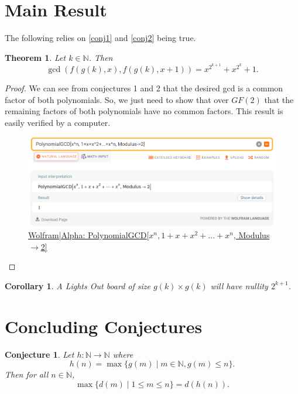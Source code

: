 \documentclass{article}
\newtheorem{theorem}{Theorem}
\newtheorem{corollary}{Corollary}
\newtheorem{conjecture}{Conjecture}
\newcommand{\N}{\mathbb{N}}
\begin{document}
	\section{Main Result}
	The following relies on \ref{conj1} and \ref{conj2} being true.
	\begin{theorem}
		Let $k \in \N$.
		Then
		\begin{equation*}
			\gcd\left(f(g(k),x),f(g(k),x+1)\right) = x^{2^{k+1}} + x^{2^k} + 1.
		\end{equation*}
	\end{theorem}
	\begin{proof}
		We can see from conjectures 1 and 2 that the desired gcd is a common factor of both polynomials.
		So, we just need to show that over $GF(2)$ that the remaining factors of both polynomials have no common factors.
		This result is easily verified by a computer.
		
		\begin{figure}[H]
			\centering
			\includegraphics[width=.8\textwidth]{wolfram_result.png}
			\caption{\href{https://www.wolframalpha.com/input/?i=PolynomialGCD\%5Bx\%5En\%2C+1\%2Bx\%2Bx\%5E2\%2B...\%2Bx\%5En\%2C+Modulus-\%3E2\%5D}{Wolfram|Alpha: PolynomialGCD[$x^n, 1+x+x^2+...+x^n$, Modulus$\to$2]}}
		\end{figure}
	\end{proof}

	\begin{corollary}
		A \textit{Lights Out} board of size $g(k) \times g(k)$ will have nullity $2^{k+1}$.
	\end{corollary}
	
	\section{Concluding Conjectures}
	\begin{conjecture}
		\label{conj3}
		Let $h: \N \to \N$ where
		\begin{equation*}
			h(n) = \max \{g(m) \mid m \in \N, g(m) \leq n\}.
		\end{equation*}
		Then for all $n \in \N$,
		\begin{equation*}
			\max \{d(m) \mid 1 \leq m \leq n\} = d(h(n)).
		\end{equation*}
	\end{conjecture}
	
\end{document}
